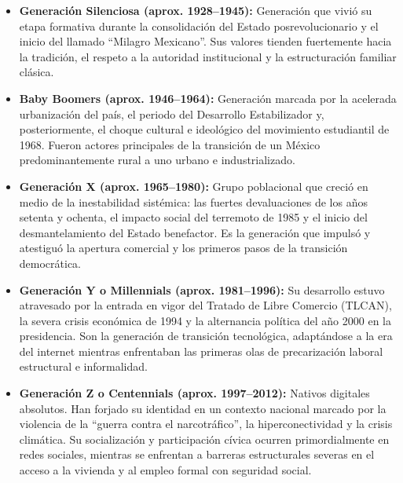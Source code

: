 \begin{itemize}
    \item \textbf{Generación Silenciosa (aprox. 1928--1945):} Generación que vivió su etapa formativa durante la
            consolidación del Estado posrevolucionario y el inicio del llamado ``Milagro Mexicano''.
            Sus valores tienden fuertemente hacia la tradición, el respeto a la autoridad institucional y la
            estructuración familiar clásica.

    \item \textbf{Baby Boomers (aprox. 1946--1964):} Generación marcada por la acelerada urbanización del país,
            el periodo del Desarrollo Estabilizador y, posteriormente, el choque cultural e ideológico del
            movimiento estudiantil de 1968. Fueron actores principales de la transición de un México
            predominantemente rural a uno urbano e industrializado.

    \item \textbf{Generación X (aprox. 1965--1980):} Grupo poblacional que creció en medio de la inestabilidad
            sistémica: las fuertes devaluaciones de los años setenta y ochenta, el impacto social del
            terremoto de 1985 y el inicio del desmantelamiento del Estado benefactor. Es la generación que
            impulsó y atestiguó la apertura comercial y los primeros pasos de la transición democrática.

    \item \textbf{Generación Y o Millennials (aprox. 1981--1996):} Su desarrollo estuvo atravesado por la
            entrada en vigor del Tratado de Libre Comercio (TLCAN), la severa crisis económica de 1994
            y la alternancia política del año 2000 en la presidencia. Son la generación de transición
            tecnológica, adaptándose a la era del internet mientras enfrentaban las primeras olas
            de precarización laboral estructural e informalidad.

    \item \textbf{Generación Z o Centennials (aprox. 1997--2012):} Nativos digitales absolutos.
            Han forjado su identidad en un contexto nacional marcado por la violencia de la
            ``guerra contra el narcotráfico'', la hiperconectividad y la crisis climática.
            Su socialización y participación cívica ocurren primordialmente en redes sociales,
            mientras se enfrentan a barreras estructurales severas en el acceso a la vivienda y al
            empleo formal con seguridad social.
\end{itemize}

